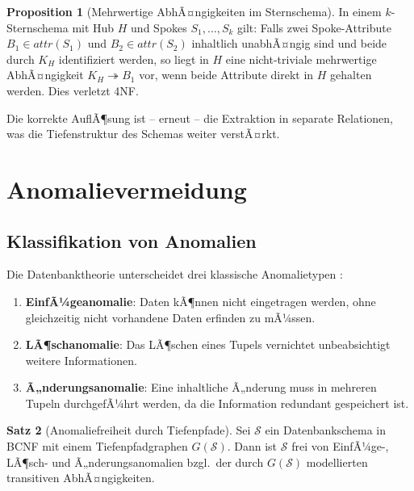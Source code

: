 ﻿\documentclass[a4paper,12pt]{report}
\theoremstyle{definition}
\newtheorem{theorem}{Satz}[chapter]
\newtheorem{proposition}[theorem]{Proposition}
\theoremstyle{remark}
\newcommand{\att}{\mathit{attr}}
\begin{document}
\begin{proposition}[Mehrwertige AbhÃ¤ngigkeiten im Sternschema]
\label{prop:mvd_stern}
In einem $k$-Sternschema mit Hub $H$ und Spokes $S_1, \ldots, S_k$ gilt:
Falls zwei Spoke-Attribute $B_1 \in \att(S_1)$ und $B_2 \in \att(S_2)$
inhaltlich unabhÃ¤ngig sind und beide durch $K_H$ identifiziert werden, so
liegt in $H$ eine nicht-triviale mehrwertige AbhÃ¤ngigkeit $K_H \twoheadrightarrow B_1$
vor, wenn beide Attribute direkt in $H$ gehalten werden. Dies verletzt 4NF.
\end{proposition}

Die korrekte AuflÃ¶sung ist -- erneut -- die Extraktion in separate Relationen,
was die Tiefenstruktur des Schemas weiter verstÃ¤rkt.

\section{Anomalievermeidung}
\label{sec:anomalien}

\subsection{Klassifikation von Anomalien}

Die Datenbanktheorie unterscheidet drei klassische Anomalietypen \cite{Date2003}:

\begin{enumerate}[label=(\roman*)]
  \item \textbf{EinfÃ¼geanomalie}: Daten kÃ¶nnen nicht eingetragen werden,
        ohne gleichzeitig nicht vorhandene Daten erfinden zu mÃ¼ssen.
  \item \textbf{LÃ¶schanomalie}: Das LÃ¶schen eines Tupels vernichtet
        unbeabsichtigt weitere Informationen.
  \item \textbf{Ã„nderungsanomalie}: Eine inhaltliche Ã„nderung muss in
        mehreren Tupeln durchgefÃ¼hrt werden, da die Information redundant gespeichert ist.
\end{enumerate}

\begin{theorem}[Anomaliefreiheit durch Tiefenpfade]
\label{thm:anomaliefrei}
Sei $\mathcal{S}$ ein Datenbankschema in BCNF mit einem Tiefenpfadgraphen
$G(\mathcal{S})$. Dann ist $\mathcal{S}$ frei von EinfÃ¼ge-, LÃ¶sch- und
Ã„nderungsanomalien bzgl.\ der durch $G(\mathcal{S})$ modellierten
transitiven AbhÃ¤ngigkeiten.
\end{theorem}
\end{document}
